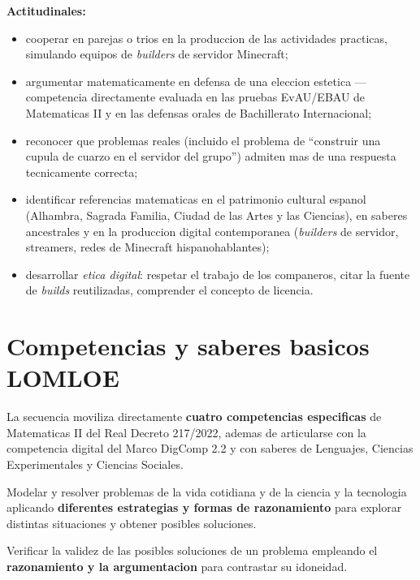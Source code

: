 \documentclass[12pt,a4paper]{scrartcl}
\newcommand{\acc}[1]{\textcolor{accent}{\textbf{#1}}}
\begin{document}
\textbf{Actitudinales:}
\begin{itemize}[leftmargin=1.3em,itemsep=0.2em,topsep=0.3em]
  \item cooperar en parejas o trios en la produccion de las actividades practicas, simulando equipos de \emph{builders} de servidor Minecraft;
  \item argumentar matematicamente en defensa de una eleccion estetica --- competencia directamente evaluada en las pruebas EvAU/EBAU de Matematicas II y en las defensas orales de Bachillerato Internacional;
  \item reconocer que problemas reales (incluido el problema de \enquote{construir una cupula de cuarzo en el servidor del grupo}) admiten mas de una respuesta tecnicamente correcta;
  \item identificar referencias matematicas en el patrimonio cultural espanol (Alhambra, Sagrada Familia, Ciudad de las Artes y las Ciencias), en saberes ancestrales y en la produccion digital contemporanea (\emph{builders} de servidor, streamers, redes de Minecraft hispanohablantes);
  \item desarrollar \emph{etica digital}: respetar el trabajo de los companeros, citar la fuente de \emph{builds} reutilizadas, comprender el concepto de licencia.
\end{itemize}

\section{Competencias y saberes basicos LOMLOE}\label{sec:bncc}

La secuencia moviliza directamente \acc{cuatro competencias especificas} de Matematicas II del Real Decreto 217/2022, ademas de articularse con la competencia digital del Marco DigComp 2.2 y con saberes de Lenguajes, Ciencias Experimentales y Ciencias Sociales.

\begin{competencia}
Modelar y resolver problemas de la vida cotidiana y de la ciencia y la tecnologia aplicando \acc{diferentes estrategias y formas de razonamiento} para explorar distintas situaciones y obtener posibles soluciones.
\end{competencia}

\begin{competencia}
Verificar la validez de las posibles soluciones de un problema empleando el \acc{razonamiento y la argumentacion} para contrastar su idoneidad.
\end{competencia}
\end{document}
